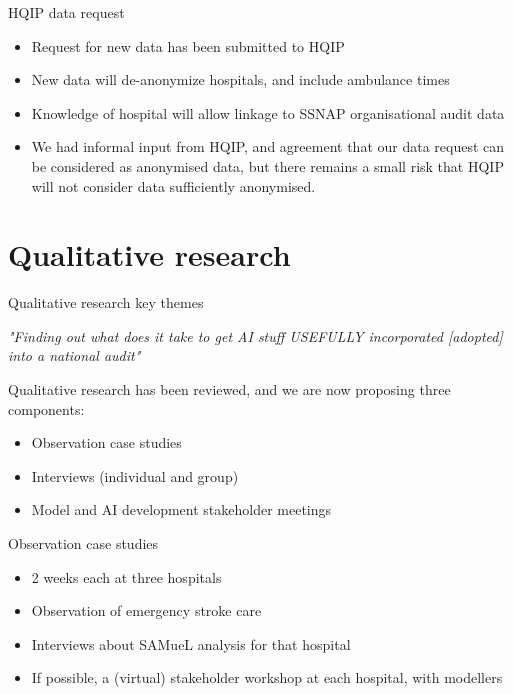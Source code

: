 \documentclass[xcolor={usenames,dvipsnames}]{beamer}
\begin{document}
\begin{frame}{HQIP data request}

\begin{itemize}
    \setlength\itemsep{3mm}
    \item Request for new data has been submitted to HQIP
    \item New data will de-anonymize hospitals, and include ambulance times
    \item Knowledge of hospital will allow linkage to SSNAP organisational audit data
    \item We had informal input from HQIP, and agreement that our data request can be considered as anonymised data, but there remains a small risk that HQIP will not consider data sufficiently anonymised.
\end{itemize}
    
\end{frame}

\section{Qualitative research}



\begin{frame}{Qualitative research key themes}

\emph{"Finding out what does it take to get AI stuff USEFULLY incorporated [adopted] into a national audit"}

\vspace{5mm}

Qualitative research has been reviewed, and we are now proposing three components:
\vspace{2mm}

\begin{itemize}
    \item Observation case studies
    \item Interviews (individual and group)
    \item Model and AI development stakeholder meetings
\end{itemize}

\end{frame}

\begin{frame}{Observation case studies}

\begin{itemize}
    \setlength\itemsep{3mm}
    \item 2 weeks each at three hospitals
    \item Observation of emergency stroke care
    \item Interviews about SAMueL analysis for that hospital
    \item If possible, a (virtual) stakeholder workshop at each hospital, with modellers
\end{itemize}
\end{frame}
\end{document}
